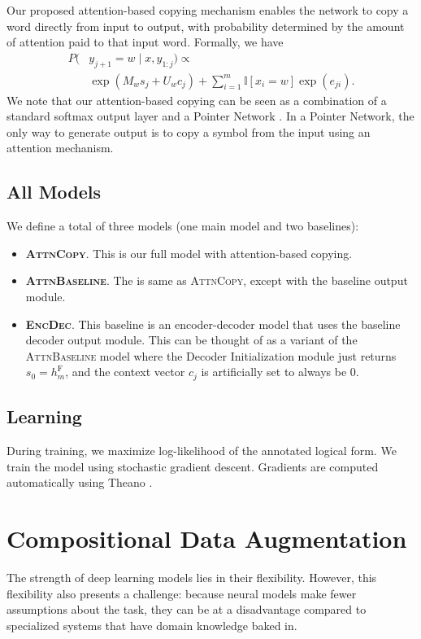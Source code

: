 \documentclass[11pt,letterpaper]{article}
\newcommand{\encdec}{\textsc{EncDec}\xspace}
\newcommand{\attn}{\textsc{AttnBaseline}\xspace}
\newcommand{\attncopy}{\textsc{AttnCopy}\xspace}
\begin{document}
Our proposed attention-based copying mechanism
enables the network to copy a word directly from input to output,
with probability determined by the amount of attention paid to that input word.
Formally, we have
\begin{align}
  P(&y_{j+1} = w \mid x, y_{1:j}) \propto 
  \\ & \exp(M_{w} s_j + U_w c_j)
  + \sum_{i=1}^m \mathbb{I}[x_i = w] \exp(e_{ji}).
\end{align}
We note that our attention-based copying can be seen as a 
combination of a standard softmax output layer
and a Pointer Network \cite{vinyals2015pointer}.  In a Pointer Network,
the only way to generate output is to copy a symbol from the input
using an attention mechanism.

\subsection{All Models}
We define a total of three models (one main model and two baselines):
\begin{itemize}
  \item \textbf{\attncopy}.  This is our full model with attention-based copying.
  \item \textbf{\attn}.  The is same as \attncopy, except with the baseline 
    output module.
  \item \textbf{\encdec}.  This baseline is an encoder-decoder model 
    \cite{sutskever2014sequence}
    that uses the baseline decoder output module.  
    This can be thought of as a variant of the \attn model
    where the Decoder Initialization module
    just returns $s_0 = h_m^{\text{F}}$,
    and the context vector $c_j$ is artificially set to always be $0$.
\end{itemize}

\subsection{Learning}
During training, we maximize log-likelihood of the annotated logical form.
We train the model using stochastic gradient descent.
Gradients are computed automatically using Theano \cite{bergstra2010theano}.

\section{Compositional Data Augmentation}
The strength of deep learning models lies in their flexibility.
However, this flexibility also presents a challenge:
because neural models make fewer assumptions about the task,
they can be at a disadvantage compared to specialized systems
that have domain knowledge baked in.
\end{document}
